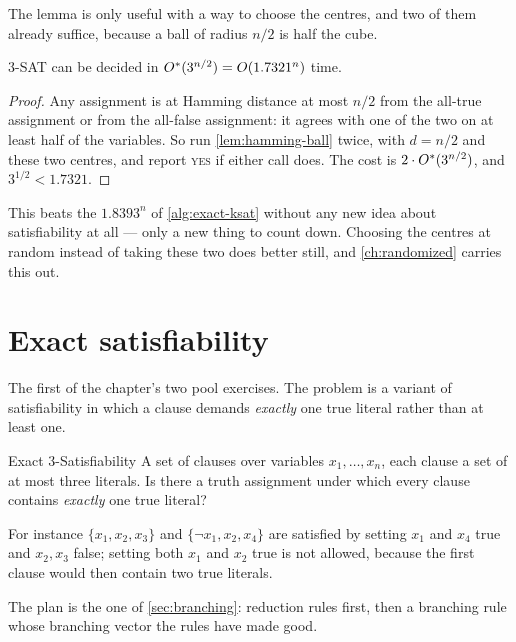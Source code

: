 The lemma is only useful with a way to choose the centres, and two of them
already suffice, because a ball of radius $n/2$ is half the cube.

\begin{theorem}\label{thm:local-search-3sat}
$3$-SAT can be decided in $O^{*}(3^{n/2}) = O\!\left(1.7321^n\right)$ time.
\end{theorem}

\begin{proof}
Any assignment is at Hamming distance at most $n/2$ from the all-true
assignment or from the all-false assignment: it agrees with one of the two on
at least half of the variables. So run \cref{lem:hamming-ball} twice, with
$d = n/2$ and these two centres, and report \textsc{yes} if either call does.
The cost is $2 \cdot O^{*}(3^{n/2})$, and $3^{1/2} < 1.7321$.
\end{proof}

This beats the $1.8393^n$ of \cref{alg:exact-ksat} without any new idea about
satisfiability at all --- only a new thing to count down. Choosing the centres
at random instead of taking these two does better still, and
\cref{ch:randomized} carries this out.

\section{Exact satisfiability}
\label{sec:exact-sat}

The first of the chapter's two pool exercises. The problem is a variant of
satisfiability in which a clause demands \emph{exactly} one true literal rather
than at least one.

\begin{probdef}{Exact 3-Satisfiability}
  \instance A set of clauses over variables $x_1,\ldots,x_n$, each clause a set
  of at most three literals.
  \question Is there a truth assignment under which every clause contains
  \emph{exactly} one true literal?
\end{probdef}

For instance $\{x_1,x_2,x_3\}$ and $\{\neg x_1, x_2, x_4\}$ are satisfied by
setting $x_1$ and $x_4$ true and $x_2, x_3$ false; setting both $x_1$ and $x_2$
true is not allowed, because the first clause would then contain two true
literals.

The plan is the one of \cref{sec:branching}: reduction rules first, then a
branching rule whose branching vector the rules have made good.

